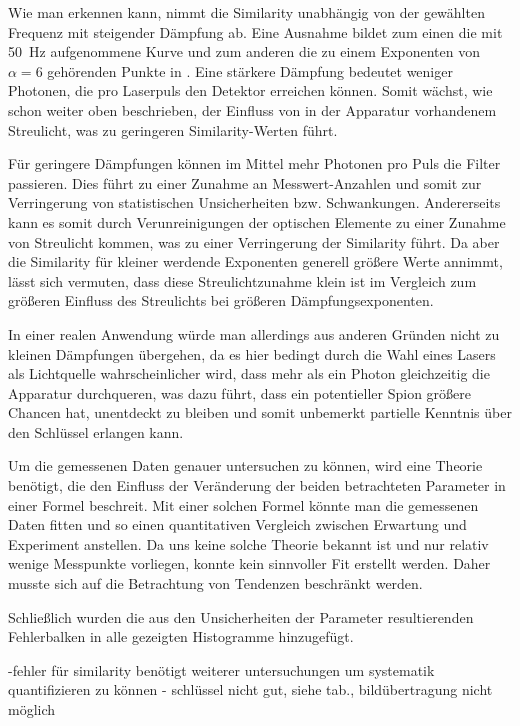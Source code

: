 Wie man erkennen kann, nimmt die Similarity unabhängig von der gewählten
Frequenz mit steigender Dämpfung ab. Eine Ausnahme bildet zum einen die mit
\SI{50}{Hz} aufgenommene Kurve und zum anderen die zu einem Exponenten von $α=6$
gehörenden Punkte in . Eine stärkere Dämpfung bedeutet weniger
Photonen, die pro Laserpuls den Detektor erreichen können. Somit wächst, wie
schon weiter oben beschrieben, der Einfluss von in der Apparatur vorhandenem
Streulicht, was zu geringeren Similarity-Werten führt.

Für geringere Dämpfungen können im Mittel mehr Photonen pro Puls die Filter
passieren. Dies führt zu einer Zunahme an Messwert-Anzahlen und somit zur
Verringerung von statistischen Unsicherheiten bzw. Schwankungen. Andererseits
kann es somit durch Verunreinigungen der optischen Elemente zu einer Zunahme
von Streulicht kommen, was zu einer Verringerung der Similarity führt. Da aber
die Similarity für kleiner werdende Exponenten generell größere Werte annimmt,
lässt sich vermuten, dass diese Streulichtzunahme klein ist im Vergleich zum
größeren Einfluss des Streulichts bei größeren Dämpfungsexponenten.

In einer realen Anwendung würde man allerdings aus anderen Gründen nicht zu
kleinen Dämpfungen übergehen, da es hier bedingt durch die Wahl
eines Lasers als Lichtquelle wahrscheinlicher wird, dass mehr als ein Photon
gleichzeitig die Apparatur durchqueren, was dazu führt, dass ein potentieller
Spion größere Chancen hat, unentdeckt zu bleiben und somit unbemerkt partielle
Kenntnis über den Schlüssel erlangen kann.

Um die gemessenen Daten genauer untersuchen zu können, wird eine Theorie
benötigt, die den Einfluss der Veränderung der beiden betrachteten Parameter in
einer Formel beschreit. Mit einer solchen Formel könnte man die gemessenen
Daten fitten und so einen quantitativen Vergleich zwischen Erwartung und
Experiment anstellen. Da uns keine solche Theorie bekannt ist und nur relativ
wenige Messpunkte vorliegen, konnte kein sinnvoller Fit erstellt werden. Daher
musste sich auf die Betrachtung von Tendenzen beschränkt werden.

Schließlich wurden die aus den Unsicherheiten der Parameter resultierenden 
Fehlerbalken in alle gezeigten Histogramme hinzugefügt. 

-fehler für similarity benötigt weiterer untersuchungen um systematik quantifizieren
zu können
- schlüssel nicht gut, siehe tab., bildübertragung nicht möglich